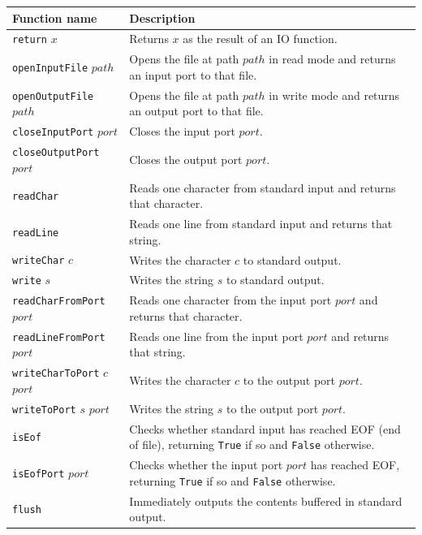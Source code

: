 \begin{table}[h]
  \begin{center}
    \begin{tabular}{ | l | p{9.5cm} |}
    \hline
    Function name & Description \\ \hline
    \texttt{return} $x$ & Returns $x$ as the result of an IO function. \\ \hline
    \texttt{openInputFile} $path$ & Opens the file at path $path$ in read mode and returns an input port to that file. \\ \hline
    \texttt{openOutputFile} $path$ & Opens the file at path $path$ in write mode and returns an output port to that file. \\ \hline
    \texttt{closeInputPort} $port$ & Closes the input port $port$. \\ \hline
    \texttt{closeOutputPort} $port$ & Closes the output port $port$. \\ \hline
    \texttt{readChar} & Reads one character from standard input and returns that character. \\ \hline
    \texttt{readLine} & Reads one line from standard input and returns that string. \\ \hline
    \texttt{writeChar} $c$ & Writes the character $c$ to standard output. \\ \hline
    \texttt{write} $s$ & Writes the string $s$ to standard output. \\ \hline
    \texttt{readCharFromPort} $port$ & Reads one character from the input port $port$ and returns that character. \\ \hline
    \texttt{readLineFromPort} $port$ & Reads one line from the input port $port$ and returns that string. \\ \hline
    \texttt{writeCharToPort} $c$ $port$ & Writes the character $c$ to the output port $port$. \\ \hline
    \texttt{writeToPort} $s$ $port$ & Writes the string $s$ to the output port $port$. \\ \hline
    \texttt{isEof} & Checks whether standard input has reached EOF (end of file), returning \texttt{True} if so and \texttt{False} otherwise. \\ \hline
    \texttt{isEofPort} $port$ & Checks whether the input port $port$ has reached EOF, returning \texttt{True} if so and \texttt{False} otherwise. \\ \hline
    \texttt{flush} & Immediately outputs the contents buffered in standard output. \\ \hline

\end{tabular}
\end{center}
\end{table}
